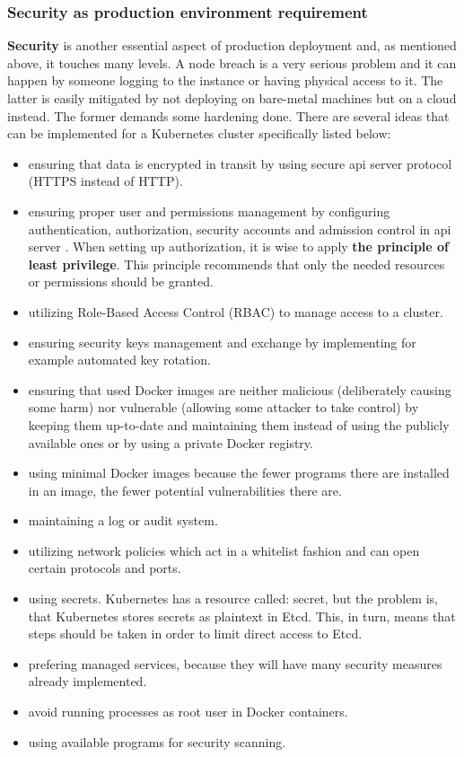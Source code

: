 \subsubsection{Security as production environment requirement}
\textbf{Security} is another essential aspect of production deployment and, as mentioned above, it touches many levels. A node breach is a very serious problem and it can happen by someone logging to the instance or having physical access to it. The latter is easily mitigated by not deploying on bare-metal machines but on a cloud instead\cite{book-mastering-k8s}. The former demands some hardening done. There are several ideas that can be implemented for a Kubernetes cluster specifically listed below:
\begin{itemize}
\item ensuring that data is encrypted in transit by using secure api server protocol (HTTPS instead of HTTP)\cite{book-mastering-k8s}.
\item ensuring proper user and permissions management by configuring authentication, authorization, security accounts and admission control in api server \cite{book-mastering-k8s}. When setting up authorization, it is wise to apply \textbf{the principle of least privilege}. This principle recommends that only the needed resources or permissions should be granted\cite{book-cndwk}.
\item utilizing Role-Based Access Control (RBAC) to manage access to a cluster\cite{book-cndwk}.
\item ensuring security keys management and exchange\cite{book-mastering-k8s} by implementing for example automated key rotation.
\item ensuring that used Docker images are neither malicious (deliberately causing some harm) nor vulnerable (allowing some attacker to take control) by keeping them up-to-date and maintaining them instead of using the publicly available ones or by using a private Docker registry\cite{book-mastering-k8s}.
\item using minimal Docker images because the fewer programs there are installed in an image, the fewer potential vulnerabilities there are\cite{book-cndwk}.
\item maintaining a log or audit system\cite{book-mastering-k8s}.
\item utilizing network policies which act in a whitelist fashion and can open certain protocols and ports\cite{book-mastering-k8s}.
\item using secrets. Kubernetes has a resource called: secret, but the problem is, that Kubernetes stores secrets as plaintext in Etcd. This, in turn, means that steps should be taken in order to limit direct access to Etcd\cite{book-mastering-k8s}.
\item prefering managed services, because they will have many security measures already implemented\cite{book-cndwk}.
\item avoid running processes as root user in Docker containers\cite{book-cndwk}.
\item using available programs for security scanning\cite{book-cndwk}.
\end{itemize}

